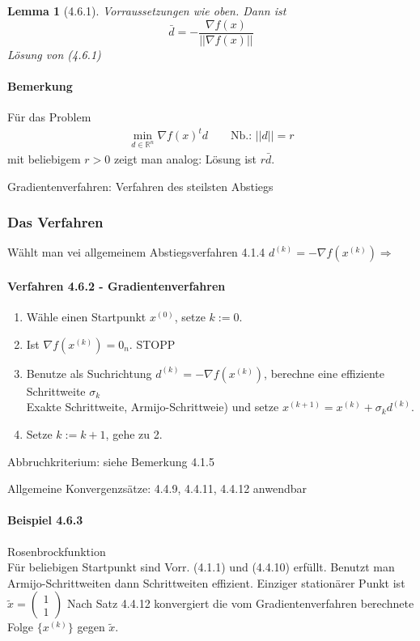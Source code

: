 \documentclass[ngerman,halfparskip]{scrartcl}
\newtheorem*{lemma}{Lemma}
\theoremstyle{definition}
\def\R{\mathbb R}
\begin{document}
\begin{lemma}[4.6.1]
Vorraussetzungen wie oben. Dann ist 
$$\bar d = - \frac {\nabla f(x)}{||\nabla f(x)||}$$
Lösung von (4.6.1)
\end{lemma}
\paragraph{Bemerkung} Für das Problem
\begin{gather*}\tag{4.6.2}
\min\limits_{d\in\R^n}\nabla f(x)^td \qquad \text{Nb.: }||d||=r
\end{gather*}
mit beliebigem $r>0$ zeigt man analog: Lösung ist $r\bar d$.

Gradientenverfahren: Verfahren des steilsten Abstiegs

\subsubsection{Das Verfahren}
Wählt man vei allgemeinem Abstiegsverfahren 4.1.4 $d^{(k)}=-\nabla f(x^{(k)}) \Rightarrow$
\paragraph{Verfahren 4.6.2 - Gradientenverfahren} 
\begin{enumerate}
\item Wähle einen Startpunkt $x^{(0)}$, setze $k:=0$.
\item Ist $\nabla f (x^{(k)})=0_n$. STOPP
\item Benutze als Suchrichtung $d^{(k)}=-\nabla f(x^{(k)})$, berechne eine effiziente Schrittweite $\sigma_k$\\
Exakte Schrittweite, Armijo-Schrittweie) und setze $x^{(k+1)}=x^{(k)}+\sigma_k d^{(k)}$.
\item Setze $k:=k+1$, gehe zu 2.
\end{enumerate}

Abbruchkriterium: siehe Bemerkung 4.1.5

Allgemeine Konvergenzsätze: 4.4.9, 4.4.11, 4.4.12 anwendbar

\paragraph{Beispiel 4.6.3} Rosenbrockfunktion\\
Für beliebigen Startpunkt sind Vorr. (4.1.1) und (4.4.10) erfüllt. Benutzt man Armijo-Schrittweiten dann Schrittweiten effizient. Einziger stationärer Punkt ist $\tilde x = \begin{pmatrix}
1\\1
\end{pmatrix}
$ Nach Satz 4.4.12 konvergiert die vom Gradientenverfahren berechnete Folge $\{x^{(k)}\}$ gegen $\tilde x$.
\end{document}
